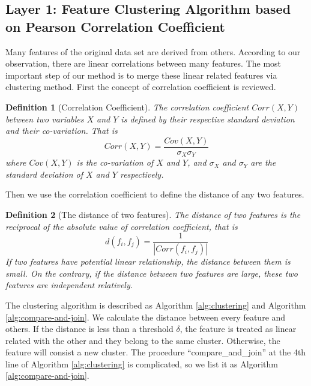 \documentclass[journal]{IEEEtran}
\newtheorem{definition}{Definition}
\begin{document}
\subsection{Layer 1: Feature Clustering Algorithm based on Pearson Correlation Coefficient}

Many features of the original data set are derived from others. According to our observation, there are linear correlations between many features. The most important step of our method is to merge these linear related features via clustering method. First the concept of correlation coefficient is reviewed.

\begin{definition}[Correlation Coefficient]
The correlation coefficient $Corr(X, Y)$ between two variables $X$ and $Y$ is defined by their respective standard deviation and their co-variation. That is
\begin{equation}
    Corr(X, Y) = \frac{Cov(X, Y)}{\sigma_X \sigma_Y}
\end{equation}
where $Cov(X, Y)$ is the co-variation of $X$ and $Y$, and $\sigma_X$ and $\sigma_Y$ are the standard deviation of $X$ and $Y$ respectively.
\end{definition}

Then we use the correlation coefficient to define the distance of any two features.

\begin{definition}[The distance of two features]
\label{def:distance}
The distance of two features is the reciprocal of the absolute value of correlation coefficient, that is
\begin{equation}
    d(f_i, f_j) = \frac{1}{|Corr(f_i, f_j)|}
\end{equation}
If two features have potential linear relationship, the distance between them is small. On the contrary, if the distance between two features are large, these two features are independent relatively.
\end{definition}

The clustering algorithm is described as Algorithm \ref{alg:clustering} and Algorithm \ref{alg:compare-and-join}. We calculate the distance between every feature and others. If the distance is less than a threshold $\delta$, the feature is treated as linear related with the other and they belong to the same cluster. Otherwise, the feature will consist a new cluster. The procedure ``compare\_and\_join'' at the 4th line of Algorithm \ref{alg:clustering} is complicated, so we list it as Algorithm \ref{alg:compare-and-join}.
\end{document}
